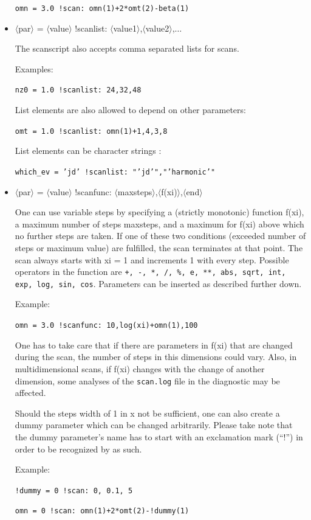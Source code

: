 \documentclass[12pt]{article}
\begin{document}
\begin{itemize}
\texttt{omn = 3.0 !scan: omn(1)+2*omt(2)-beta(1)}

\item 
$\langle$par$\rangle$ = $\langle$value$\rangle$ !scanlist: $\langle 
$value1$\rangle$,$\langle$value2$\rangle$,$\ldots$

The scanscript also accepts comma separated lists for scans. 

Examples:

\texttt{nz0 = 1.0 !scanlist: 24,32,48}

List elements are also allowed to depend on other parameters:

\texttt{omt = 1.0 !scanlist: omn(1)+1,4,3,8}

List elements can be character strings :

\texttt{which\_ev  = 'jd' !scanlist: "'jd'","'harmonic'"}

\item $\langle$par$\rangle$ = $\langle$value$\rangle$ !scanfunc:
$\langle $maxsteps$\rangle$,$\langle$f(xi)$\rangle$,$\langle$end$\rangle$

One can use variable steps by
specifying a (strictly monotonic) function f(xi), a maximum number of steps
maxsteps, and a maximum for f(xi) above which no further steps are taken. If one of these two
conditions (exceeded number of steps or maximum value) are fulfilled, the scan
terminates at that point. The scan always starts with xi = 1 and increments 1
with every step. Possible
operators in the function are \texttt{+, -, *, /, \%, e, **, abs, sqrt, int, exp, log,
sin, cos}. Parameters can be inserted as described further down.

Example:

\texttt{omn = 3.0 !scanfunc: 10,log(xi)+omn(1),100}

One has to take care that if there are parameters in f(xi) that are changed
during the scan, the number of steps in this dimensions could vary. Also, in multidimensional
scans, if f(xi) changes with the change of another dimension, some analyses of the
\texttt{scan.log} file in the diagnostic may be affected.

Should the steps width of 1 in x not be sufficient, one can also create a dummy parameter
which can be changed arbitrarily. Please take note that the
dummy parameter's name has to start with an exclamation mark (``!'') in order to be recognized
by \gene as such. 

Example: 

\texttt{!dummy = 0 !scan: 0, 0.1, 5}

\texttt{omn = 0 !scan: omn(1)+2*omt(2)-!dummy(1)}

\end{itemize}
\end{document}

